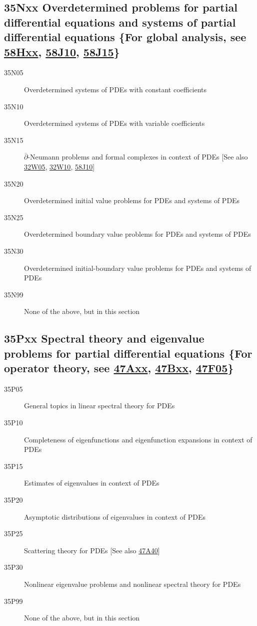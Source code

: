 \subsection*{35Nxx  Overdetermined problems for partial differential equations and systems of partial differential equations \{For global analysis, see \hyperref[58Hxx]{58Hxx}, \hyperref[58J10]{58J10}, \hyperref[58J15]{58J15}\} }\label{35Nxx}
\begin{description}  
\item [35N05]\label{35N05} Overdetermined systems of PDEs with constant coefficients
\item [35N10]\label{35N10} Overdetermined systems of PDEs with variable coefficients
\item [35N15]\label{35N15} $\overline\partial$-Neumann problems  and formal complexes in context of PDEs [See also \hyperref[32W05]{32W05}, \hyperref[32W10]{32W10}, \hyperref[58J10]{58J10}]
\item [35N20]\label{35N20} Overdetermined initial value problems for PDEs and systems of PDEs
\item [35N25]\label{35N25} Overdetermined boundary value problems for PDEs and systems of PDEs
\item [35N30]\label{35N30} Overdetermined initial-boundary value problems for PDEs and systems of PDEs
\item [35N99]\label{35N99} None of the above, but in this section
\end{description}
\subsection*{35Pxx  Spectral theory and eigenvalue problems for partial differential equations \{For operator theory, see \hyperref[47Axx]{47Axx}, \hyperref[47Bxx]{47Bxx}, \hyperref[47F05]{47F05}\} }\label{35Pxx}
\begin{description}  
\item [35P05]\label{35P05} General topics in linear spectral theory for PDEs
\item [35P10]\label{35P10} Completeness of eigenfunctions and eigenfunction expansions in context of  PDEs
\item [35P15]\label{35P15} Estimates of  eigenvalues in context of PDEs
\item [35P20]\label{35P20} Asymptotic distributions of eigenvalues in context of PDEs
\item [35P25]\label{35P25} Scattering theory for PDEs [See also \hyperref[47A40]{47A40}]
\item [35P30]\label{35P30} Nonlinear eigenvalue problems and nonlinear spectral theory for PDEs
\item [35P99]\label{35P99} None of the above, but in this section
\end{description}
